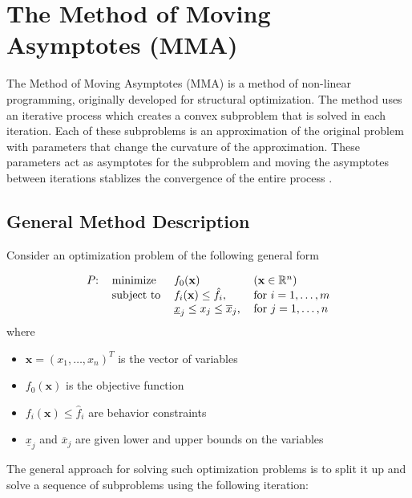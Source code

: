 \section{The Method of Moving Asymptotes (MMA)}\label{sec:MMA}

The Method of Moving Asymptotes (MMA) is a method of non-linear programming, originally developed for structural optimization. The method uses an iterative process which creates a convex subproblem that is solved in each iteration. Each of these subproblems is an approximation of the original problem with parameters that change the curvature of the approximation. These parameters act as asymptotes for the subproblem and moving the asymptotes between iterations stablizes the convergence of the entire process \cite{Svanberg1987}.

\subsection{General Method Description}
Consider an optimization problem of the following general form

\begin{equation}
	\begin{tabular}{llll}
		$P$: & minimize   & $f_0(\mathbf{x})$                                & $\left(\mathbf{x}\in\mathbb{R}^n\right)$ \\
		     & subject to & $f_i(\mathbf{x})\leq\hat{f}_i$,                  & for $i=1,\ldots,m$                    \\
		     &            & $\underline{x}_j\leq x_j\leq \overline{x}_j$, & for $j=1,\ldots,n$                    
	\end{tabular}
\end{equation}
where
\begin{itemize}
	\item $\mathbf{x}=\left(x_1,\ldots,x_n\right)^T$ is the vector of variables
	\item $f_0(\mathbf{x})$ is the objective function
	\item $f_i(\mathbf{x})\leq\hat{f}_i$ are behavior constraints
	\item $\underline{x}_j$ and $\overline{x}_j$ are given lower and upper bounds on the variables
\end{itemize}

The general approach for solving such optimization problems is to split it up and solve a sequence of subproblems using the following iteration:

